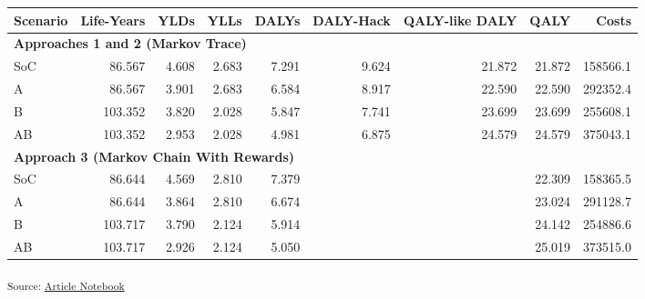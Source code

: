 \documentclass[
]{agujournal2019}
\begin{document}
\begin{table}
\centering
\begin{tabular}{l|r|r|r|r|r|r|r|r}
\hline
Scenario & Life-Years & YLDs & YLLs & DALYs & DALY-Hack & QALY-like DALY & QALY & Costs\\
\hline
\multicolumn{9}{l}{\textbf{Approaches 1 and 2 (Markov Trace)}}\\
\hline
\hspace{1em}SoC & 86.567 & 4.608 & 2.683 & 7.291 & 9.624 & 21.872 & 21.872 & 158566.1\\
\hline
\hspace{1em}A & 86.567 & 3.901 & 2.683 & 6.584 & 8.917 & 22.590 & 22.590 & 292352.4\\
\hline
\hspace{1em}B & 103.352 & 3.820 & 2.028 & 5.847 & 7.741 & 23.699 & 23.699 & 255608.1\\
\hline
\hspace{1em}AB & 103.352 & 2.953 & 2.028 & 4.981 & 6.875 & 24.579 & 24.579 & 375043.1\\
\hline
\multicolumn{9}{l}{\textbf{Approach 3 (Markov Chain With Rewards)}}\\
\hline
\hspace{1em}SoC & 86.644 & 4.569 & 2.810 & 7.379 &  &  & 22.309 & 158365.5\\
\hline
\hspace{1em}A & 86.644 & 3.864 & 2.810 & 6.674 &  &  & 23.024 & 291128.7\\
\hline
\hspace{1em}B & 103.717 & 3.790 & 2.124 & 5.914 &  &  & 24.142 & 254886.6\\
\hline
\hspace{1em}AB & 103.717 & 2.926 & 2.124 & 5.050 &  &  & 25.019 & 373515.0\\
\hline
\end{tabular}
\end{table}

\textsubscript{Source:
\href{https://graveja0.github.io/dalys/index.qmd.html}{Article
Notebook}}
\end{document}
